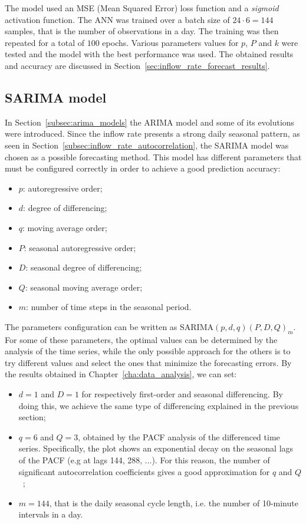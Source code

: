 The model used an MSE (Mean Squared Error) loss function and a \emph{sigmoid} activation function. The ANN was trained over a batch size of \( 24 \cdot 6 = 144 \) samples, that is the number of observations in a day. The training was then repeated for a total of \( 100 \) epochs. Various parameters values for \( p \), \( P \) and \( k \) were tested and the model with the best performance was used. The obtained results and accuracy are discussed in Section~\ref{sec:inflow_rate_forecast_results}.

\subsection{SARIMA model}
\label{subsec:sarima_model}
In Section~\ref{subsec:arima_models} the ARIMA model and some of its evolutions were introduced. Since the inflow rate presents a strong daily seasonal pattern, as seen in Section~\ref{subsec:inflow_rate_autocorrelation}, the SARIMA model was chosen as a possible forecasting method. This model has different parameters that must be configured correctly in order to achieve a good prediction accuracy:
\begin{itemize}
  \item \( p \): autoregressive order;
  \item \( d \): degree of differencing;
  \item \( q \): moving average order;
  \item \( P \): seasonal autoregressive order;
  \item \( D \): seasonal degree of differencing;
  \item \( Q \): seasonal moving average order;
  \item \( m \): number of time steps in the seasonal period.
\end{itemize}

The parameters configuration can be written as \( \text{SARIMA}(p,d,q)(P,D,Q)_m \). For some of these parameters, the optimal values can be determined by the analysis of the time series, while the only possible approach for the others is to try different values and select the ones that minimize the forecasting errors. By the results obtained in Chapter~\ref{cha:data_analysis}, we can set:
\begin{itemize}
  \item \( d = 1 \) and \( D = 1 \) for respectively first-order and seasonal differencing. By doing this, we achieve the same type of differencing explained in the previous section;
  \item \( q = 6 \) and \( Q = 3 \), obtained by the PACF analysis of the differenced time series. Specifically, the plot shows an exponential decay on the seasonal lags of the PACF (e.g at lags 144, 288, ...). For this reason, the number of significant autocorrelation coefficients gives a good approximation for \( q \) and \( Q \)~\cite{hyndman2018};
  \item \( m = 144 \), that is the daily seasonal cycle length, i.e. the number of 10-minute intervals in a day.
\end{itemize}

